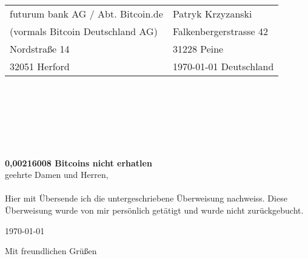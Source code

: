 \documentclass{letter}
\begin{document}
\begin{letter}{}
\begin{tabular}{@{}p{3.0in}l}

futurum bank AG / Abt. Bitcoin.de 	& Patryk Krzyzanski\\
(vormals Bitcoin Deutschland AG)  	& Falkenbergerstrasse 42\\
Nordstraße 14  			& 31228 Peine\\
32051 Herford    					& \today
Deutschland				  			\end{tabular}\\ \\ \\ \\
\bigskip
\\
\\
\Large\textbf{ 0,00216008 Bitcoins nicht erhatlen }\\
\bigskip
\normalsize
\Sehr geehrte Damen und Herren, \\\\
Hier mit \"Ubersende ich die untergeschriebene \"Uberweisung nachweiss.
Diese Überweisung wurde von mir persönlich getätigt und wurde nicht zurückgebucht.
\\
\bigskip

\today
 
\closing{Mit freundlichen Grüßen}



\end{letter}
\end{document}
